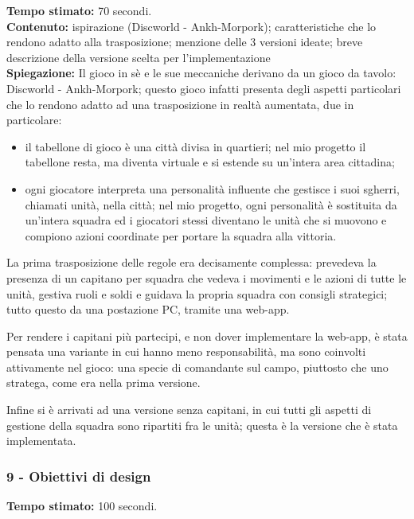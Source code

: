 \documentclass[
	twoside]				%
	{toptesi}				%
\begin{document}
	\textbf{Tempo stimato:} 70 secondi. \\
	
	\textbf{Contenuto:} ispirazione (Discworld - Ankh-Morpork); caratteristiche che lo rendono adatto alla trasposizione; menzione delle 3 versioni ideate; breve descrizione della versione scelta per l'implementazione \\
	
	\textbf{Spiegazione:} Il gioco in sè e le sue meccaniche derivano da un gioco da tavolo: Discworld - Ankh-Morpork; questo gioco infatti presenta degli aspetti particolari che lo rendono adatto ad una trasposizione in realtà aumentata, due in particolare:
	\begin{itemize}
		\item il tabellone di gioco è una città divisa in quartieri; nel mio progetto il tabellone resta, ma diventa virtuale e si estende su un'intera area cittadina;
		
		\item ogni giocatore interpreta una personalità influente che gestisce i suoi sgherri, chiamati unità, nella città; nel mio progetto, ogni personalità è sostituita da un'intera squadra ed i giocatori stessi diventano le unità che si muovono e compiono azioni coordinate per portare la squadra alla vittoria.
	\end{itemize}

	La prima trasposizione delle regole era decisamente complessa: prevedeva la presenza di un capitano per squadra che vedeva i movimenti e le azioni di tutte le unità, gestiva ruoli e soldi e guidava la propria squadra con consigli strategici; tutto questo da una postazione PC, tramite una web-app.
	
	Per rendere i capitani più partecipi, e non dover implementare la web-app, è stata pensata una variante in cui hanno meno responsabilità, ma sono coinvolti attivamente nel gioco: una specie di comandante sul campo, piuttosto che uno stratega, come era nella prima versione.
	
	Infine si è arrivati ad una versione senza capitani, in cui tutti gli aspetti di gestione della squadra sono ripartiti fra le unità; questa è la versione che è stata implementata.

	\subsubsection{9 - Obiettivi di design}
	
	\textbf{Tempo stimato:} 100 secondi. \\
	
\end{document}
